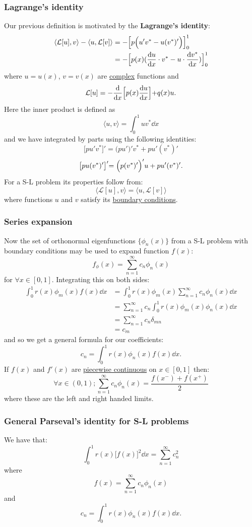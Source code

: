 \documentclass{article}
\begin{document}
\subsubsection{Lagrange's identity}
Our previous definition is motivated by the \textbf{Lagrange's identity}:
\begin{align*}
    \langle \mathcal{L}[u], v \rangle - \langle u, \mathcal{L}[v] \rangle
    &=-\Bigl[p\Bigl(u'v^*-u(v^*)'\Bigl)\Bigl]_{0}^{1} \\
    &=-\Bigl[p(x)(\dv{u}{x}\cdot v^*-u\cdot\dv{v^*}{x})\Bigl]_{0}^{1}
\end{align*}
where $u=u(x)$, $v=v(x)$ are \underline{complex} functions and
$$\mathcal{L}[u]=-\dv{x}\Bigl[p(x)\dv{u}{x}\Bigl]+q(x)u.$$
Here the inner product is defined as
$$\langle u,v \rangle=\int_{0}^{1}uv^* \dd x$$
and we have integrated by parts using the following identities:
$$\bigl[pu'v^*\bigl]'=\bigl(pu'\bigl)'v^*+pu'(v^*)'$$
$$\bigl[pu(v^*)'\bigl]'=\Bigl(p(v^*)'\Bigl)'u+pu'(v^*)'.$$
For a S-L problem its properties follow from:
$$\langle \mathcal{L}[u], v \rangle=\langle u, \mathcal{L}[v] \rangle$$
where functions $u$ and $v$
satisfy its \underline{boundary conditions}.

\newpage

\subsubsection{Series expansion}
Now the set of orthonormal eigenfunctions $\{\phi_n(x)\}$
from a S-L problem with boundary conditions
may be used to expand function $f(x)$:
$$f_\phi(x)=\sum_{n=1}^{\infty} c_n\phi_n(x)$$
for $\forall x\in[0,1]$. Integrating this on both sides:
\begin{align*}
    \int_{0}^{1}r(x)\phi_m(x)f(x)\dd x
    &=\int_{0}^{1}r(x)\phi_m(x)
    \sum_{n=1}^{\infty} c_n\phi_n(x)\dd x \\
    &=\sum_{n=1}^{\infty} c_n
    \int_{0}^{1}r(x)\phi_m(x)\phi_n(x)\dd x \\
    &=\sum_{n=1}^{\infty} c_n\delta_{mn} \\
    &=c_m
\end{align*}
and so we get a general formula for our coefficients:
$$c_n=\int_{0}^{1}r(x)\phi_n(x)f(x)\dd x.$$
If $f(x)$ and $f'(x)$ are \underline{piecewise continuous}
on $x\in[0,1]$ then:
$$\forall x\in(0,1);\sum_{n=1}^{\infty} c_n\phi_n(x)
=\frac{f(x^-)+f(x^+)}{2}$$
where these are the left and right handed limits.

\subsubsection{General Parseval's identity for S-L problems}
We have that:
$$\int_{0}^{1}r(x)\bigl[f(x)\bigr]^2\dd x
=\sum_{n=1}^{\infty}c_n^2$$
where
$$f(x)=\sum_{n=1}^{\infty} c_n\phi_n(x)$$
and
$$c_n=\int_{0}^{1}r(x)\phi_n(x)f(x)\dd x.$$
\end{document}
